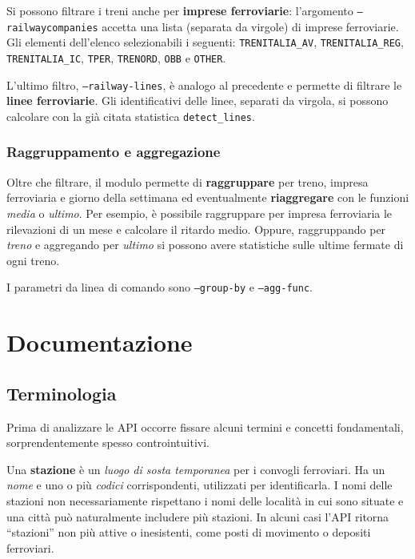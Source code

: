 \documentclass[12pt,italian]{report}
\begin{document}
Si possono filtrare i treni anche per \textbf{imprese ferroviarie}:
l'argomento \texttt{--railway\-companies} accetta una lista (separata
da virgole) di imprese ferroviarie.  Gli elementi dell'elenco
selezionabili i seguenti: \texttt{TRENITALIA\_\-AV},
\texttt{TRENITALIA\_\-REG}, \texttt{TRENITALIA\_\-IC}, \texttt{TPER},
\texttt{TRENORD}, \texttt{OBB} e \texttt{OTHER}.

L'ultimo filtro, \texttt{--railway\--lines}, è analogo al precedente e
permette di filtrare le \textbf{linee ferroviarie}.  Gli
identificativi delle linee, separati da virgola, si possono calcolare
con la già citata statistica \texttt{detect\-\_lines}.

\subsection{Raggruppamento e aggregazione}

Oltre che filtrare, il modulo permette di \textbf{raggruppare} per
treno, impresa ferroviaria e giorno della settimana ed eventualmente
\textbf{riaggregare} con le funzioni \textit{media} o \textit{ultimo}.
Per esempio, è possibile raggruppare per impresa ferroviaria le
rilevazioni di un mese e calcolare il ritardo medio.  Oppure,
raggruppando per \textit{treno} e aggregando per \textit{ultimo} si
possono avere statistiche sulle ultime fermate di ogni treno.

I parametri da linea di comando sono \texttt{--group\--by} e
\texttt{--agg\--func}.


\printbibliography


\appendix

\chapter{Documentazione}
\label{documentazione}

\section{Terminologia}
\label{terminologia}

Prima di analizzare le API occorre fissare alcuni termini e concetti
fondamentali, sorprendentemente spesso controintuitivi.

Una \textbf{stazione} è un \textit{luogo di sosta temporanea} per i
convogli ferroviari.  Ha un \textit{nome} e uno o più \textit{codici}
corrispondenti, utilizzati per identificarla.  I nomi delle stazioni
non necessariamente rispettano i nomi delle località in cui sono
situate e una città può naturalmente includere più stazioni.  In
alcuni casi l'API ritorna ``stazioni'' non più attive o inesistenti,
come posti di movimento o depositi ferroviari.
\end{document}
